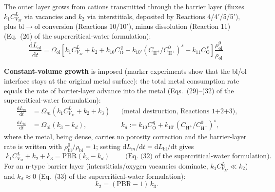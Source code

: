 The outer layer grows from cations transmitted through the barrier layer
(fluxes $k_1 C_{V_M}^{L}$ via vacancies and $k_2$ via interstitials, deposited
by Reactions 4/4$'$/5/5$'$), plus bl$\to$ol conversion (Reactions 10/10$'$),
minus dissolution (Reaction 11)
(Eq.~(26) of the supercritical-water formulation):
\begin{equation}
\frac{\mathrm{d}L_{\mathrm{ol}}}{\mathrm{d}t}
= \Omega_{\mathrm{ol}} \left[ k_1 C_{V_M}^{L} + k_2
+ k_{10} C_{\mathrm{O}}^{\,q}
+ k_{10'} \left( C_{\mathrm{H^+}}/C^0_{\mathrm{H^+}} \right)^{s}
- k_{11} C_{\mathrm{O}}^{\,r} \right]
\frac{\rho^0_{\mathrm{ol}}}{\rho_{\mathrm{ol}}} .
\label{eq:olode-full}
\end{equation}

\textbf{Constant-volume growth} is imposed (marker experiments show that the
bl/ol interface stays at the original metal surface): the total metal
consumption rate equals the rate of barrier-layer advance into the metal
(Eqs.~(29)--(32) of the supercritical-water formulation):
\begin{align}
\frac{\mathrm{d}L_m}{\mathrm{d}t} &= \Omega_m \left( k_1 C_{V_M}^{L} + k_2 + k_3 \right)
&&\text{(metal destruction, Reactions 1+2+3)} , \\
\frac{\mathrm{d}L_{\mathrm{bl}}}{\mathrm{d}t} &= \Omega_{\mathrm{bl}} \left( k_3 - k_d \right) ,
&&k_d := k_{10} C_{\mathrm{O}}^{\,q}
+ k_{10'} \left( C_{\mathrm{H^+}}/C^0_{\mathrm{H^+}} \right)^{s} ,
\end{align}
where the metal, being dense, carries no porosity correction and the
barrier-layer rate is written with $\rho^0_{\mathrm{bl}}/\rho_{\mathrm{bl}}
= 1$; setting $\mathrm{d}L_m/\mathrm{d}t = \mathrm{d}L_{\mathrm{bl}}/\mathrm{d}t$
gives
\begin{equation}
\boxed{\;
k_1 C_{V_M}^{L} + k_2 + k_3 = \mathrm{PBR} \left( k_3 - k_d \right)
\;}
\qquad
\text{(Eq.~(32) of the supercritical-water formulation)} .
\label{eq:cv}
\end{equation}
For an n-type barrier layer (interstitials/oxygen vacancies dominate,
$k_1 C_{V_M}^{L} \ll k_2$) and $k_d \approx 0$
(Eq.~(33) of the supercritical-water formulation):
\begin{equation}
k_2 = (\mathrm{PBR} - 1)\, k_3 .
\end{equation}

